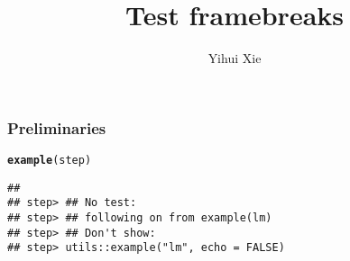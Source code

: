 \documentclass{beamer}\usepackage{graphicx, color}
\title{Test framebreaks}
\author{Yihui Xie}
\newcommand{\hlfunctioncall}[1]{\textcolor[rgb]{0.501960784313725,0,0.329411764705882}{\textbf{#1}}}%
\newenvironment{knitrout}{}{} %
\begin{document}
\maketitle



\begin{frame}
\frametitle{Preliminaries}
\begin{knitrout}\footnotesize
{}\color{fgcolor}
\begin{alltt}
\hlfunctioncall{example}(step)
\end{alltt}
\begin{verbatim}
## 
## step> ## No test: 
## step> ## following on from example(lm)
## step> ## Don't show: 
## step> utils::example("lm", echo = FALSE)


\end{verbatim}
\end{knitrout}
\end{frame}
\end{document}
